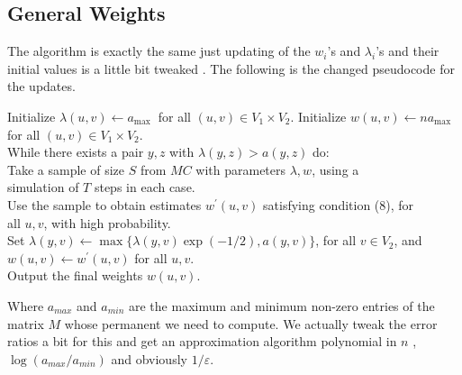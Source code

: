\subsection{General Weights}
\begin{flushleft}
	The algorithm is exactly the same just updating of the $w_i$'s and $\lambda_i$'s and their initial values is a little bit tweaked . The following is the changed pseudocode for the updates.
\end{flushleft}
\begin{flushleft}
	Initialize $\lambda(u, v) \leftarrow a_{\text {max }}$ for all $(u, v) \in V_1 \times V_2$.
	Initialize $w(u, v) \leftarrow n a_{\max }$ for all $(u, v) \in V_1 \times V_2$.\\
	While there exists a pair $y, z$ with $\lambda(y, z)>a(y, z)$ do:\\
	\parinn Take a sample of size $S$ from $M C$ with parameters $\lambda, w$, using a \\simulation of $T$ steps in each case.\\
	Use the sample to obtain estimates $w^{\prime}(u, v)$ satisfying condition (8), for \\all $u, v$, with high probability.\\
	Set $\lambda(y, v) \leftarrow \max \{\lambda(y, v) \exp (-1 / 2), a(y, v)\}$, for all $v \in V_2$, and \\$w(u, v) \leftarrow w^{\prime}(u, v)$ for all $u, v$.\\
	\parinf
	Output the final weights $w(u, v)$.
\end{flushleft}
Where $a_{max}$ and $a_{min}$ are the maximum and minimum non-zero entries of the matrix $M$ whose permanent we need to compute. We actually tweak  the error ratios a bit for this and get an approximation algorithm polynomial in $n$ , $\log{(a_{max}/a_{min})}$ and obviously $1/\varepsilon$.

